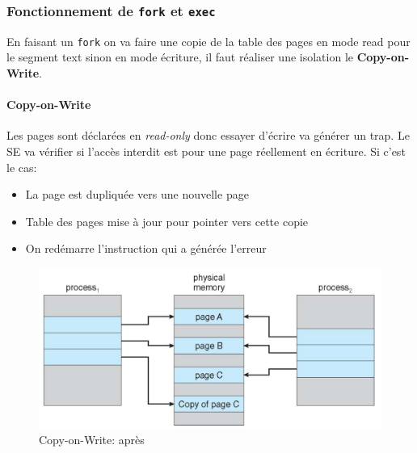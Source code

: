 \subsubsection{\texorpdfstring{Fonctionnement de \texttt{fork} et
\texttt{exec}}{Fonctionnement de fork et exec}}\label{fonctionnement-de-fork-et-exec}

En faisant un \texttt{fork} on va faire une copie de la table des pages
en mode read pour le segment text sinon en mode écriture, il faut
réaliser une isolation le \textbf{Copy-on-Write}.

\paragraph{Copy-on-Write}\label{copy-on-write}

Les pages sont déclarées en \emph{read-only} donc essayer d'écrire va
générer un trap. Le SE va vérifier si l'accès interdit est pour une page
réellement en écriture. Si c'est le cas:

\begin{itemize}
\tightlist
\item
  La page est dupliquée vers une nouvelle page
\item
  Table des pages mise à jour pour pointer vers cette copie
\item
  On redémarre l'instruction qui a générée l'erreur
\end{itemize}

\begin{figure}
\centering
\includegraphics{image-63.png}
\caption{Copy-on-Write: après}
\end{figure}
